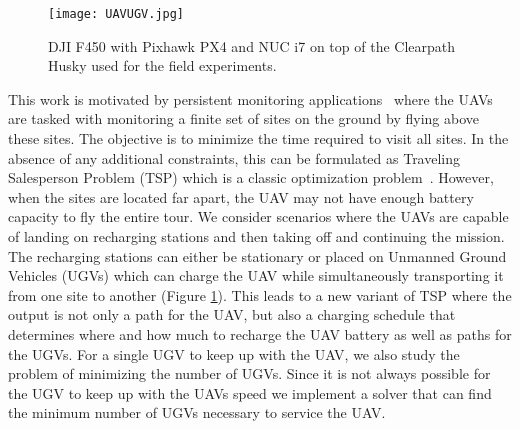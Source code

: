 \documentclass[letterpaper,10pt,conference]{ieeeconf}
\begin{document}
\begin{figure}[ht]
\texttt{[image: UAVUGV.jpg]}
\caption{DJI F450 with Pixhawk PX4 and NUC i7 on top of the Clearpath Husky used for the field experiments.}
\label{fig:realUAV}
\end{figure}

This work is motivated by persistent monitoring applications~\cite{smith2011persistent} where the UAVs are tasked with monitoring a finite set of sites on the ground by flying above these sites. The objective is to minimize the time required to visit all sites. In the absence of any additional constraints, this can be formulated as  Traveling Salesperson Problem (TSP) which is a classic optimization problem~\cite{arora1998polynomial}. However, when the sites are located far apart, the UAV may not have enough battery capacity to fly the entire tour. We consider scenarios where the UAVs are capable of landing on recharging stations and then taking off and continuing the mission. The recharging stations can either be stationary or placed on Unmanned Ground Vehicles (UGVs) which can charge the UAV while simultaneously transporting it from one site to another (Figure \ref{fig:realUAV}). This leads to a new variant of TSP where the output is not only a path for the UAV, but also a charging schedule that determines where and how much to recharge the UAV battery as well as paths for the UGVs. For a single UGV to keep up with the UAV, we also study the problem of minimizing the number of UGVs. Since it is not always possible for the UGV to keep up with the UAVs speed we implement a solver that can find the minimum number of UGVs necessary to service the UAV.

\end{document}
